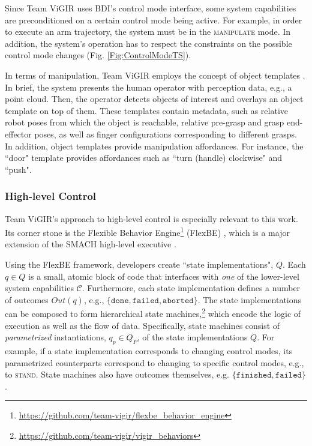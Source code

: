 Since Team ViGIR uses BDI's control mode interface, some system capabilities are preconditioned on a certain control mode being active.
For example, in order to execute an arm trajectory, the system must be in the \textsc{manipulate} mode.
In addition, the system's operation has to respect the constraints on the possible control mode changes (Fig. \ref{Fig:ControlModeTS}).

In terms of manipulation, Team ViGIR employs the concept of object templates \cite{Alberto2014Humanoids}.
In brief, the system presents the human operator with perception data, e.g., a point cloud.
Then, the operator detects objects of interest and overlays an object template on top of them.
These templates contain metadata, such as relative robot poses from which the object is reachable, relative pre-grasp and grasp end-effector poses, as well as finger configurations corresponding to different grasps.
In addition, object templates provide manipulation affordances.
For instance, the ``door" template provides affordances such as ``turn (handle) clockwise" and ``push".

\subsubsection*{High-level Control}\label{S:FlexBE}
Team ViGIR's approach to high-level control is especially relevant to this work.
Its corner stone is the Flexible Behavior Engine\footnote{\scriptsize{\url{https://github.com/team-vigir/flexbe_behavior_engine}}} (FlexBE) \cite{Philipp2013Bsc, Philipp2015Msc}, which is a major extension of the SMACH high-level executive \cite{SMACH2010RAM}.

Using the FlexBE framework, developers create ``state implementations", $Q$. %
Each $q \in Q$ is a small, atomic block of code that interfaces with \emph{one} of the lower-level system capabilities $\mathcal{C}$.
Furthermore, each state implementation defines a number of outcomes $Out(q)$, e.g., $\{ \mathtt{done}, \mathtt{failed}, \mathtt{aborted} \}$.
The state implementations can be composed to form hierarchical state machines,\footnote{\scriptsize{\url{https://github.com/team-vigir/vigir_behaviors}}}
 which encode the logic of execution as well as the flow of data.
Specifically, state machines consist of \emph{parametrized} instantiations, $q_p \in Q_P$, of the state implementations $Q$.
For example, if a state implementation corresponds to changing control modes, its parametrized counterparts correspond to changing to specific control modes, e.g., to \textsc{stand}.
State machines also have outcomes themselves, e.g. $\{ \mathtt{finished}, \mathtt{failed} \}$.

